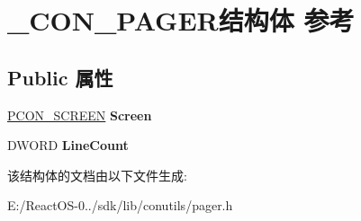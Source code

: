 \hypertarget{struct___c_o_n___p_a_g_e_r}{}\section{\+\_\+\+C\+O\+N\+\_\+\+P\+A\+G\+E\+R结构体 参考}
\label{struct___c_o_n___p_a_g_e_r}
\subsection*{Public 属性}
\begin{DoxyCompactItemize}
\item 
\mbox{\label{struct___c_o_n___p_a_g_e_r_aee8e19c3db9643e4ca3b7bbbfbd95258}} 
\hyperlink{struct___c_o_n___s_c_r_e_e_n}{P\+C\+O\+N\+\_\+\+S\+C\+R\+E\+EN} {\bfseries Screen}
\item 
\mbox{\label{struct___c_o_n___p_a_g_e_r_a0b9d9ab83256ec953ffe5d04ee127593}} 
D\+W\+O\+RD {\bfseries Line\+Count}
\end{DoxyCompactItemize}


该结构体的文档由以下文件生成\+:\begin{DoxyCompactItemize}
\item 
E\+:/\+React\+O\+S-\/0../sdk/lib/conutils/pager.\+h\end{DoxyCompactItemize}
